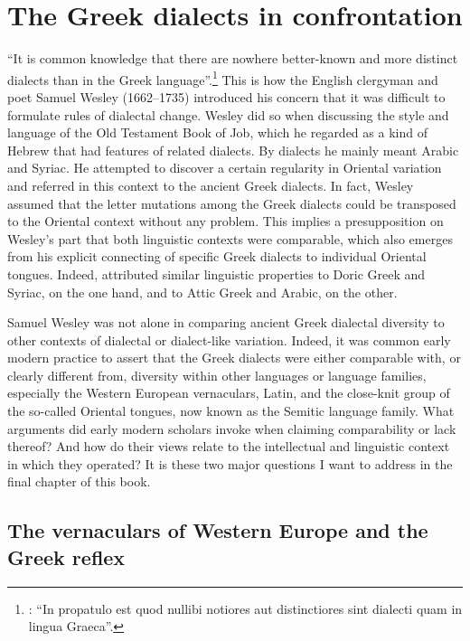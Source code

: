 \chapter{The Greek dialects in confrontation}\label{chap:8}

“It is common knowledge that there are nowhere better-known and more distinct dialects than in the Greek language”.\footnote{\citet[23]{Wesley1736}: “In propatulo est quod nullibi notiores aut distinctiores sint dialecti quam in lingua Graeca”.} This is how the English clergyman and poet Samuel Wesley (1662–1735) introduced his concern that it was difficult to formulate rules of dialectal change. Wesley did so when discussing the style and language of the Old Testament Book of Job, which he regarded as a kind of Hebrew that had features of related dialects. By dialects he mainly meant Arabic and Syriac. He attempted to discover a certain regularity in Oriental variation and referred in this context to the ancient Greek dialects. In fact, Wesley assumed that the letter mutations among the Greek dialects could be transposed to the Oriental context without any problem. This implies a presupposition on Wesley’s part that both linguistic contexts were comparable, which also emerges from his explicit connecting of specific Greek dialects to individual Oriental tongues. Indeed, \citet[24]{Wesley1736} attributed similar linguistic properties to Doric Greek and Syriac, on the one hand, and to Attic Greek and Arabic, on the other.

Samuel Wesley was not alone in comparing ancient Greek dialectal diversity to other contexts of dialectal or dialect-like variation. Indeed, it was common early modern practice to assert that the Greek dialects were either comparable with, or clearly different from, diversity within other languages or language families, especially the Western European vernaculars, Latin, and the close-knit group of the so-called Oriental tongues, now known as the Semitic language family. What arguments did early modern scholars invoke when claiming comparability or lack thereof? And how do their views relate to the intellectual and linguistic context in which they operated? It is these two major questions I want to address in the final chapter of this book.

\section{The vernaculars of Western Europe and the Greek reflex}\label{sec:8.1}

